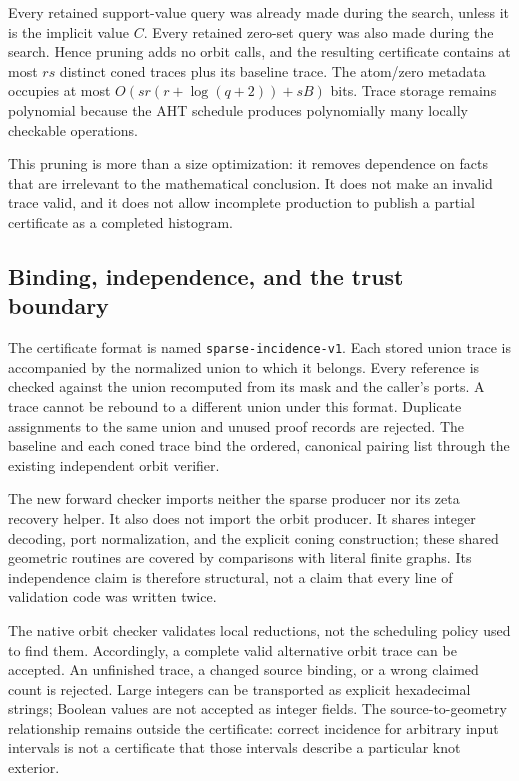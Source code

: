 \documentclass[11pt,letterpaper]{article}
\theoremstyle{definition}
\newcommand{\code}[1]{\texttt{#1}}
\begin{document}
Every retained support-value query was already made during the search,
unless it is the implicit value $C$. Every retained zero-set query was also
made during the search. Hence pruning adds no orbit calls, and the resulting
certificate contains at most $rs$ distinct coned traces plus its baseline
trace. The atom/zero metadata occupies at most
$O(sr(r+\log(q+2))+sB)$ bits. Trace storage remains polynomial because the
AHT schedule produces polynomially many locally checkable operations.

This pruning is more than a size optimization: it removes dependence on
facts that are irrelevant to the mathematical conclusion. It does not make
an invalid trace valid, and it does not allow incomplete production to
publish a partial certificate as a completed histogram.

\subsection{Binding, independence, and the trust boundary}
The certificate format is named \code{sparse-incidence-v1}. Each stored
union trace is accompanied by the normalized union to which it belongs.
Every reference is checked against the union recomputed from its mask and
the caller's ports. A trace cannot be rebound to a different union under
this format. Duplicate assignments to the same union and unused proof
records are rejected. The baseline and each coned trace bind the ordered,
canonical pairing list through the existing independent orbit verifier.

The new forward checker imports neither the sparse producer nor its zeta
recovery helper. It also does not import the orbit producer. It shares
integer decoding, port normalization, and the explicit coning construction;
these shared geometric routines are covered by comparisons with literal
finite graphs. Its independence claim is therefore structural, not a claim
that every line of validation code was written twice.

The native orbit checker validates local reductions, not the scheduling
policy used to find them. Accordingly, a complete valid alternative orbit
trace can be accepted. An unfinished trace, a changed source binding, or a
wrong claimed count is rejected. Large integers can be transported as
explicit hexadecimal strings; Boolean values are not accepted as integer
fields. The source-to-geometry relationship remains outside the certificate:
correct incidence for arbitrary input intervals is not a certificate that
those intervals describe a particular knot exterior.
\end{document}
